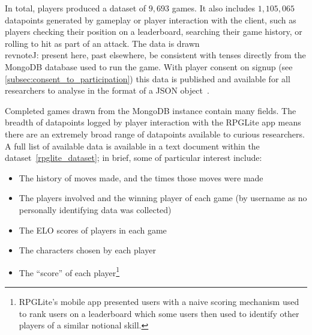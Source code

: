 In total, players produced a dataset of $9,693$ games. It also includes
$1,105,065$ datapoints generated by gameplay or player interaction with the
client, such as players checking their position on a leaderboard, searching
their game history, or rolling to hit as part of an attack. The data is
drawn\\revnote{J: present here, past elsewhere, be consistent with tenses}
directly from the MongoDB database used to run the game. With player consent on
signup (see \cref{subsec:consent_to_participation}) this data is published and
available for all researchers to analyse in the format of a JSON
object~\cite{rpglite_dataset}.

Completed games drawn from the MongoDB instance contain many fields. The breadth
of datapoints logged by player interaction with the RPGLite app means there are
an extremely broad range of datapoints available to curious
researchers. A full
list of available data is available in a text document within the
dataset~\cref{rpglite_dataset}; in brief, some of particular interest include:

\begin{itemize}
    \item The history of moves made, and the times those moves were
made
\item The players involved and the winning player of each game (by username as
no personally identifying data was collected)
\item The ELO scores of players in each game
\item The characters chosen by each player
\item The ``score'' of each player\footnote{RPGLite's mobile app presented users
with a naive scoring mechanism used to rank users on a leaderboard which some
users then used to identify other players of a similar notional skill.}
\end{itemize}

